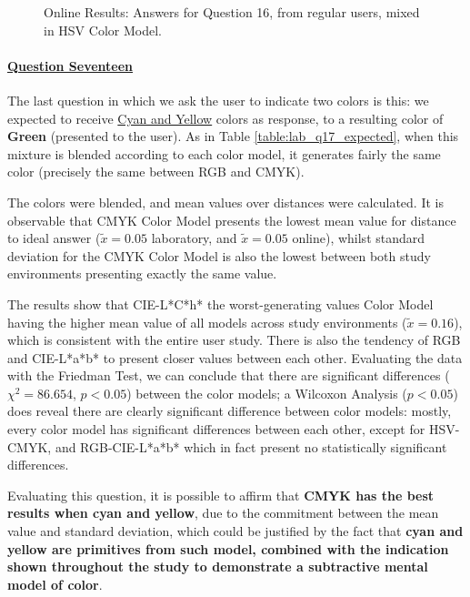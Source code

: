 \begin{figure}[htbp]
\begin{minipage}{0.48\textwidth}
    \caption[Online Results: Answers for Question 16, from regular users, mixed in HSV Color Model.]{Online Results: Answers for Question 16, from regular users, mixed in HSV Color Model.}
    \label{fig:onlinehsvregular_16}
  \end{minipage}
\end{figure}
%
\paragraph{\ul{Question Seventeen}}
%
The last question in which we ask the user to indicate two colors is this: we expected to receive \ul{Cyan and Yellow} colors as response, to a resulting color of \textbf{Green}
(presented to the user). As in Table \ref{table:lab_q17_expected}, when this mixture is blended according to each color model, it generates fairly the same color (precisely the same between
RGB and CMYK). \par
%
The colors were blended, and mean values over distances were calculated. It is observable that CMYK Color Model presents the lowest mean value for distance to ideal answer ($\tilde{x} = 0.05$
laboratory, and $\tilde{x} = 0.05$ online), whilst standard deviation for the CMYK Color Model is also the lowest between both study environments presenting exactly the same value. \par
%
The results show that CIE-L*C*h* the worst-generating values Color Model having the higher mean value of all models across study environments ($\tilde{x} = 0.16$), which is consistent with the
entire user study. There is also the tendency of RGB and CIE-L*a*b* to present closer values between each other. Evaluating the data with the Friedman Test, we can conclude that there are significant
differences ($\chi^2 = 86.654$, $p < 0.05$) between the color models; a Wilcoxon Analysis ($p < 0.05$) does reveal there are clearly significant difference between color models: mostly, every color model
has significant differences between each other, except for HSV-CMYK, and RGB-CIE-L*a*b* which in fact present no statistically significant differences. \par
%
Evaluating this question, it is possible to affirm that \textbf{CMYK has the best results when cyan and yellow}, due to the commitment between the mean value and standard deviation, which
could be justified by the fact that \textbf{cyan and yellow are primitives from such model, combined with the indication shown throughout the study to demonstrate a subtractive mental model of color}. \par

